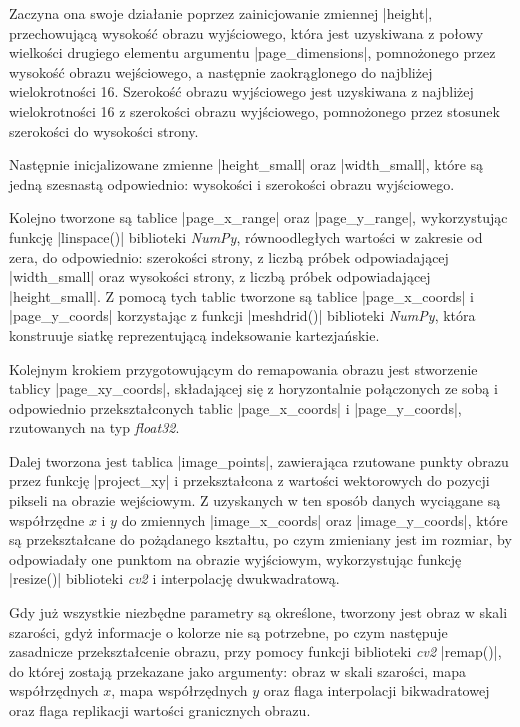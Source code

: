 Zaczyna ona swoje działanie poprzez zainicjowanie zmiennej \pyth|height|, przechowującą wysokość obrazu wyjściowego, która jest uzyskiwana z połowy wielkości drugiego elementu argumentu \pyth|page_dimensions|, pomnożonego przez wysokość obrazu wejściowego, a następnie zaokrąglonego do najbliżej wielokrotności 16. Szerokość obrazu wyjściowego jest uzyskiwana z najbliżej wielokrotności 16 z szerokości obrazu wyjściowego, pomnożonego przez stosunek szerokości do wysokości strony.

Następnie inicjalizowane zmienne \pyth|height_small| oraz \pyth|width_small|, które są jedną szesnastą odpowiednio: wysokości i szerokości obrazu wyjściowego.

Kolejno tworzone są tablice \pyth|page_x_range| oraz \pyth|page_y_range|, wykorzystując funkcję \pyth|linspace()| biblioteki \textit{NumPy}, równoodległych wartości w zakresie od zera, do odpowiednio: szerokości strony, z liczbą próbek odpowiadającej \pyth|width_small| oraz wysokości strony, z liczbą próbek odpowiadającej \pyth|height_small|. Z pomocą tych tablic tworzone są tablice \pyth|page_x_coords| i \pyth|page_y_coords| korzystając z funkcji \pyth|meshdrid()| biblioteki \textit{NumPy}, która konstruuje siatkę reprezentującą indeksowanie kartezjańskie.

Kolejnym krokiem przygotowującym do remapowania obrazu jest stworzenie tablicy \pyth|page_xy_coords|, składającej się z horyzontalnie połączonych ze sobą i odpowiednio przekształconych tablic \pyth|page_x_coords| i \pyth|page_y_coords|, rzutowanych na typ \textit{float32}.

Dalej tworzona jest tablica \pyth|image_points|, zawierająca rzutowane punkty obrazu przez funkcję \pyth|project_xy| i przekształcona z wartości wektorowych do pozycji pikseli na obrazie wejściowym. Z uzyskanych w ten sposób danych wyciągane są współrzędne $x$ i $y$ do zmiennych \pyth|image_x_coords| oraz \pyth|image_y_coords|, które są przekształcane do pożądanego kształtu, po czym zmieniany jest im rozmiar, by odpowiadały one punktom na obrazie wyjściowym, wykorzystując funkcję \pyth|resize()| biblioteki \textit{cv2} i interpolację dwukwadratową.

Gdy już wszystkie niezbędne parametry są określone, tworzony jest obraz w skali szarości, gdyż informacje o kolorze nie są potrzebne, po czym następuje zasadnicze przekształcenie obrazu, przy pomocy funkcji biblioteki \textit{cv2} \pyth|remap()|, do której zostają przekazane jako argumenty: obraz w skali szarości, mapa współrzędnych $x$, mapa współrzędnych $y$ oraz flaga interpolacji bikwadratowej oraz flaga replikacji wartości granicznych obrazu.

